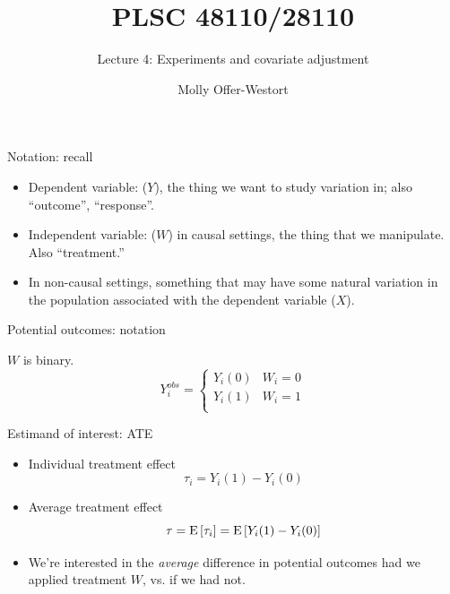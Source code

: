 \documentclass[xcolor={dvipsnames},handout]{beamer}
\title{PLSC 48110/28110}
\subtitle{Lecture 4: Experiments and covariate adjustment}
\date{}
\author{Molly Offer-Westort}
\institute{Department of Political Science, \\University of Chicago}
\begin{document}
\frame{\titlepage
\thispagestyle{empty}
}
\begin{frame}{Notation: recall}

\begin{itemize}
\item Dependent variable: ($Y$), the thing we want to study variation in; also ``outcome'', ``response''. 
\item Independent variable: ($W$) in causal settings, the thing that we manipulate. Also ``treatment.''
\item In non-causal settings, something that may have some natural variation in the population associated with the dependent variable ($X$). 
\end{itemize}
\end{frame}



\begin{frame}{Potential outcomes: notation}

$W$ is binary. 
$$
Y_i^{obs} = \begin{cases}
Y_i(0) & W_i = 0 \\
Y_i(1) & W_i = 1 \\
\end{cases}
$$

\end{frame}



\begin{frame}{Estimand of interest: ATE}


\begin{itemize}
\item Individual treatment effect
$$
\tau_i = Y_i(1)-Y_i(0)
$$ 
\item Average treatment effect
$$
\tau = {\textrm E}\,[\tau_i]  = {\textrm E}\,[Y_i(1)-Y_i(0)]
$$

\item We're interested in the \textit{average} difference in potential outcomes had we applied treatment $W$, vs. if we had not. 
\end{itemize}

\end{frame}
\end{document}
